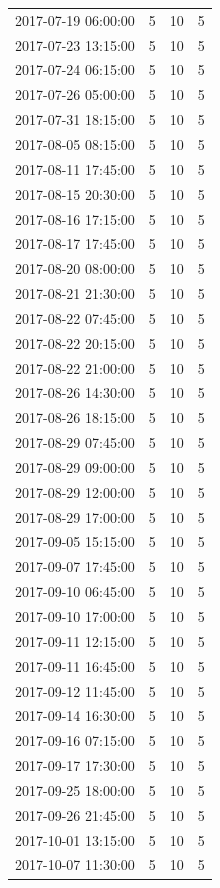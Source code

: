 \begin{tabular}{lrrr}
2017-07-19 06:00:00 & 5 & 10 & 5 \\
2017-07-23 13:15:00 & 5 & 10 & 5 \\
2017-07-24 06:15:00 & 5 & 10 & 5 \\
2017-07-26 05:00:00 & 5 & 10 & 5 \\
2017-07-31 18:15:00 & 5 & 10 & 5 \\
2017-08-05 08:15:00 & 5 & 10 & 5 \\
2017-08-11 17:45:00 & 5 & 10 & 5 \\
2017-08-15 20:30:00 & 5 & 10 & 5 \\
2017-08-16 17:15:00 & 5 & 10 & 5 \\
2017-08-17 17:45:00 & 5 & 10 & 5 \\
2017-08-20 08:00:00 & 5 & 10 & 5 \\
2017-08-21 21:30:00 & 5 & 10 & 5 \\
2017-08-22 07:45:00 & 5 & 10 & 5 \\
2017-08-22 20:15:00 & 5 & 10 & 5 \\
2017-08-22 21:00:00 & 5 & 10 & 5 \\
2017-08-26 14:30:00 & 5 & 10 & 5 \\
2017-08-26 18:15:00 & 5 & 10 & 5 \\
2017-08-29 07:45:00 & 5 & 10 & 5 \\
2017-08-29 09:00:00 & 5 & 10 & 5 \\
2017-08-29 12:00:00 & 5 & 10 & 5 \\
2017-08-29 17:00:00 & 5 & 10 & 5 \\
2017-09-05 15:15:00 & 5 & 10 & 5 \\
2017-09-07 17:45:00 & 5 & 10 & 5 \\
2017-09-10 06:45:00 & 5 & 10 & 5 \\
2017-09-10 17:00:00 & 5 & 10 & 5 \\
2017-09-11 12:15:00 & 5 & 10 & 5 \\
2017-09-11 16:45:00 & 5 & 10 & 5 \\
2017-09-12 11:45:00 & 5 & 10 & 5 \\
2017-09-14 16:30:00 & 5 & 10 & 5 \\
2017-09-16 07:15:00 & 5 & 10 & 5 \\
2017-09-17 17:30:00 & 5 & 10 & 5 \\
2017-09-25 18:00:00 & 5 & 10 & 5 \\
2017-09-26 21:45:00 & 5 & 10 & 5 \\
2017-10-01 13:15:00 & 5 & 10 & 5 \\
2017-10-07 11:30:00 & 5 & 10 & 5 \\

\end{tabular}
